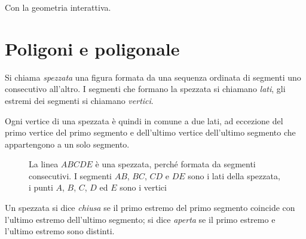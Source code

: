 \ifcoding
Con la geometria interattiva.


\fi


% 




\section{Poligoni e poligonale}
\label{sect:poligoni}

\begin{definizione}
Si chiama \emph{spezzata} una figura formata da una sequenza ordinata 
di segmenti uno consecutivo all'altro. I segmenti che formano la 
spezzata si chiamano \emph{lati}, gli estremi dei segmenti si 
chiamano \emph{vertici}.
\end{definizione}

Ogni vertice di una spezzata è quindi in comune a due lati, ad 
eccezione del primo vertice del primo segmento e dell'ultimo vertice 
dell'ultimo segmento che appartengono a un solo segmento.


\begin{inaccessibleblock}
 \begin{figure}[htb]
\centering
\caption{La linea $ABCDE$ è una spezzata, perché formata da segmenti 
consecutivi. I segmenti $AB$, $BC$, $CD$ e $DE$ sono i lati della 
spezzata, i punti $A$, $B$, $C$, $D$ ed $E$ sono i vertici}
\end{figure}
\end{inaccessibleblock}

\begin{definizione}
Un spezzata si dice \emph{chiusa} se il primo estremo del primo 
segmento coincide con l'ultimo estremo dell'ultimo segmento; si dice 
\emph{aperta} se il primo estremo e l'ultimo estremo sono distinti.
\end{definizione}

